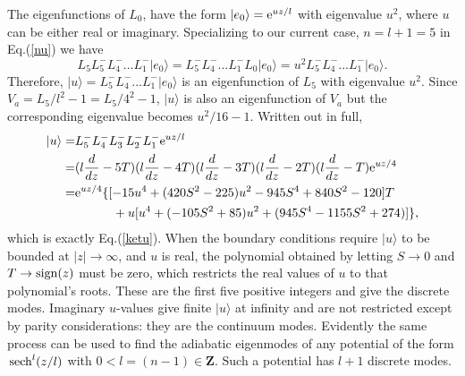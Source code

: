 \documentclass{jpp}
\def\ket#1{|#1\rangle}
\def\sech{{\,\rm sech}}
\def\etothe#1{{\rm e}^{#1}}
\begin{document}
The eigenfunctions of $L_0$, have the form $\ket{e_0}=\etothe{uz/l}$
with eigenvalue $u^2$, where $u$ can be either real or
imaginary. Specializing to our current case, $n=l+1=5$ in
Eq.(\ref{nu}) we have
\begin{equation}
  L_5 L_5 ^- L_4^- ... L_1^- \ket{e_0}
  = L_5 ^- L_4^- ... L_1^- L_0 \ket{e_0}
  =u^2 L_5 ^- L_4^- ... L_1^- \ket{e_0}.
\end{equation}
Therefore, $\ket{u}=L_5 ^- L_4^- ... L_1^- \ket{e_0}$ is an
eigenfunction of $L_5$ with eigenvalue $u^2$. Since $V_a=L_5/l^2-1=L_5/4^2-1$,
$\ket{u}$ is also an eigenfunction of $V_a$ but the corresponding
eigenvalue becomes $u^2/16-1$. Written out in full,
\begin{equation}
\begin{split}
      \ket{u}=& L_5^- L_4^- L_3^- L_2^-L_1^-\etothe{uz/l} \\
      =&(l\frac{d}{dz}-5T)(l\frac{d}{dz}-4T)(l\frac{d}{dz}-3T)(l\frac{d}{dz}-2T)(l\frac{d}{dz}-T)\etothe{uz/4}\\
      =&\mathrm{e}^{uz/4}\{[-15u^4+(420S^2-225)u^2-945S^4+840S^2-120]T\\
      &\quad\quad\quad+u[u^4+(-105S^2+85)u^2+(945S^4-1155S^2+274)]\},
\end{split}
\label{e5}
\end{equation}
which is exactly Eq.(\ref{ketu}). When the boundary conditions require
$\ket{u}$ to be bounded at $|z| \to \infty$, and $u$ is real, the
polynomial obtained by letting $S\to 0$ and $T\to {\rm sign}(z)$ must
be zero, which restricts the real values of $u$ to that polynomial's
roots. These are the first five positive integers and give the
discrete modes. Imaginary $u$-values give finite $\ket{u}$ at infinity
and are not restricted except by parity considerations: they are the
continuum modes. Evidently the same process can be used to find the
adiabatic eigenmodes of any potential of the form $\sech^{l}(z/l)$
with $0<l=(n-1)\in \mathbf{Z}$. Such a potential has $l+1$ discrete
modes.


\end{document}

